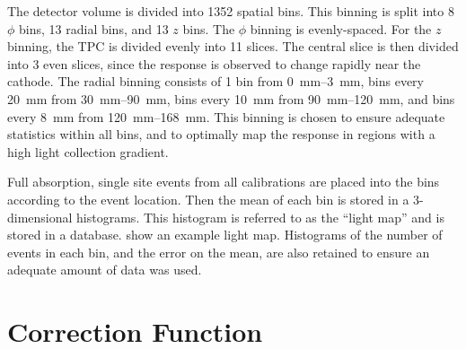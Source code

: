 \documentclass[herrin-thesis.tex]{subfiles}
\begin{document}
The detector volume is divided into 1352 spatial bins. This binning is split into 8 \(\phi\) bins, 13 radial bins, and 13 \(z\) bins. The \(\phi\) binning is evenly-spaced. For the \(z\) binning, the TPC is divided evenly into 11 slices. The central slice is then divided into 3 even slices, since the response is observed to change rapidly near the cathode. The radial binning consists of 1 bin from \SIrange{0}{3}{\mm}, bins every \SI{20}{mm} from \SIrange{30}{90}{\mm}, bins every \SI{10}{\mm} from \SIrange{90}{120}{\mm}, and bins every \SI{8}{mm} from \SIrange{120}{168}{\mm}. This binning is chosen to ensure adequate statistics within all bins, and to optimally map the response in regions with a high light collection gradient.

Full absorption, single site events from all calibrations are placed into the bins according to the event location. Then the mean of each bin is stored in a 3-dimensional histograms. This histogram is referred to as the ``light map'' and is stored in a database.   show an example light map. Histograms of the number of events in each bin, and the error on the mean, are also retained to ensure an adequate amount of data was used.

\section{Correction Function}
\end{document}
